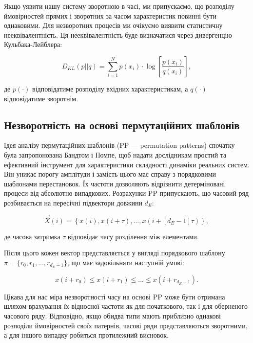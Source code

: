 \documentclass[
  letterpaper,
]{report}
\begin{document}
Якщо уявити нашу систему зворотною в часі, ми припускаємо, що розподілу
ймовірностей прямих і зворотних за часом характеристик повинні бути
однаковими. Для незворотних процесів ми очікуємо виявити статистичну
нееквівалентність. Ця нееквівалентність буде визначатися через
дивергенцію Кульбака-Лейблера:

\[ 
D_{KL}(p||q) = \sum_{i=1}^{N} p(x_{i}) \cdot \log{\left[ \frac{p(x_{i})}{q(x_{i})} \right]}, 
\]

де \(p(\cdot)\) відповідатиме розподілу вхідних характеристикам, а
\(q(\cdot)\) відповідатиме зворотнім.

\hypertarget{ux43dux435ux437ux432ux43eux440ux43eux442ux43dux456ux441ux442ux44c-ux43dux430-ux43eux441ux43dux43eux432ux456-ux43fux435ux440ux43cux443ux442ux430ux446ux456ux439ux43dux438ux445-ux448ux430ux431ux43bux43eux43dux456ux432}{%
\subsection{Незворотність на основі пермутаційних
шаблонів}\label{ux43dux435ux437ux432ux43eux440ux43eux442ux43dux456ux441ux442ux44c-ux43dux430-ux43eux441ux43dux43eux432ux456-ux43fux435ux440ux43cux443ux442ux430ux446ux456ux439ux43dux438ux445-ux448ux430ux431ux43bux43eux43dux456ux432}}

Ідея аналізу пермутаційних шаблонів (PP --- permutation patterns)
спочатку була запропонована Бандтом і Помпе, щоб надати дослідникам
простий та ефективний інструмент для характеристики складності динаміки
реальних систем. Він уникає порогу амплітуди і замість цього має справу
з порядковими шаблонами перестановок. Їх частоти дозволяють відрізнити
детерміновані процеси від абсолютно випадкових. Розрахунки PP
припускають, що часовий ряд розбивається на пересічні підвектори довжини
\(d_{E}\):

\[ 
\vec{X}(i) = \left\{ x(i), x(i+\tau), ... , x(i+[d_{E}-1]\tau) \right\}, 
\]

де часова затримка \(\tau\) відповідає часу розділення між елементами.

Після цього кожен вектор представляється у вигляді порядкового шаблону
\(\pi = \{ r_0, r_1, ... , r_{d_{E}-1} \}\), що має задовільняти
наступній умові:

\[ 
x(i+r_0) \leq x(i+r_1) \leq ... \leq x(i+r_{d_{E}-1}).
\]

Цікава для нас міра незворотності часу на основі PP може бути отримана
шляхом врахування їх відносної частоти як для початкового, так і для
оберненого часового ряду. Відповідно, якщо обидва типи мають приблизно
однакові розподіли ймовірностей своїх патернів, часові ряди
представляються зворотними, а для іншого випадку робиться протилежний
висновок.
\end{document}
